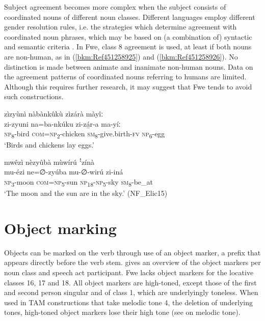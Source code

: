 Subject agreement becomes more complex when the subject consists of coordinated nouns of different noun classes. Different languages employ different gender resolution rules, i.e. the strategies which determine agreement with coordinated noun phrases, which may be based on (a combination of) syntactic and semantic criteria \citep{Corbett1991}. In Fwe, class 8 agreement is used, at least if both nouns are non-human, as in (\ref{bkm:Ref451258925}) and (\ref{bkm:Ref451258926}). No distinction is made between animate and inanimate non-human nouns. Data on the agreement patterns of coordinated nouns referring to humans are limited. Although this requires further research, it may suggest that Fwe tends to avoid such constructions.

\ea
\label{bkm:Ref451258925}
zìzyùnì nàbànkûkù zìzárà màyîː\\
\gll zi-zyuni  na=ba-nkúku    zi-zá̲r-a    ma-yíː\\
\textsc{np}\textsubscript{8}-bird  \textsc{com}=\textsc{np}\textsubscript{2}-chicken  \textsc{sm}\textsubscript{8}-give.birth-\textsc{fv}  \textsc{np}\textsubscript{6}-egg\\
\glt ‘Birds and chickens lay eggs.’
\z

\ea
\label{bkm:Ref451258926}
mwêzì nèzyûbà mùwírú ꜝzínà\\
\gll mu-ézi  ne=∅-zyúba    mu-∅-wirú  zi-iná\\
\textsc{np}\textsubscript{3}-moon  \textsc{com}=\textsc{np}\textsubscript{5}-sun    \textsc{np}\textsubscript{18}-\textsc{np}\textsubscript{5}-sky  \textsc{sm}\textsubscript{8}-be\_at\\
\glt ‘The moon and the sun are in the sky.’ (NF\_Elic15)
\z
\section{Object marking}
\label{bkm:Ref451511050}\hypertarget{Toc75352674}{}\label{bkm:Ref75169159}
Objects can be marked on the verb through use of an object marker, a prefix that appears directly before the verb stem.  gives an overview of the object markers per noun class and speech act participant. Fwe lacks object markers for the locative classes 16, 17 and 18. All object markers are high-toned, except those of the first and second person singular and of class 1, which are underlyingly toneless. When used in TAM constructions that take melodic tone 4, the deletion of underlying tones, high-toned object markers lose their high tone (see  on melodic tone).

